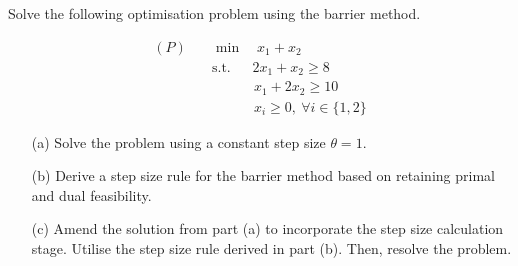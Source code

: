 Solve the following optimisation problem using the barrier method.


\begin{align}
 (P) \quad &   \min \quad  x_1 + x_2\\
    &\text{s.t. } \ \quad 2x_1 + x_2 \geq 8 \\
    & \quad\quad\quad x_1 + 2x_2 \geq 10 \\
    & \quad\quad\quad x_i \geq 0, \ \forall i \in \{1,2\}
\end{align}

\begin{itemize}
    \item[(a)] Solve the problem using a constant step size $\theta = 1$.
    \item[(b)] Derive a step size rule for the barrier method based on retaining primal and dual feasibility.
    \item[(c)] Amend the solution from part (a) to incorporate the step size calculation stage. Utilise the step size rule derived in part (b). Then, resolve the problem.
\end{itemize}
